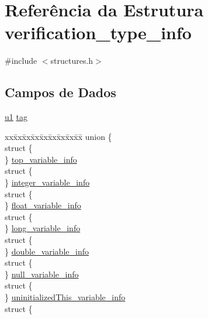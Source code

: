 \hypertarget{structverification__type__info}{}\section{Referência da Estrutura verification\+\_\+type\+\_\+info}
\label{structverification__type__info}


{\ttfamily \#include $<$structures.\+h$>$}

\subsection*{Campos de Dados}
\begin{DoxyCompactItemize}
\item 
\hyperlink{lista__operandos_8h_ad9f4cdb6757615aae2fad89dab3c5470}{u1} \hyperlink{structverification__type__info_aeb9c72b398b4d3ce0863a916f973b05c}{tag}
\item 
\begin{tabbing}
xx\=xx\=xx\=xx\=xx\=xx\=xx\=xx\=xx\=\kill
union \{\\
\>struct \{\\
\>\} \hyperlink{structverification__type__info_ae8a25f3b3f2824a904c772ecbbd249e1}{top\_variable\_info}\\
\>struct \{\\
\>\} \hyperlink{structverification__type__info_a518dcb2dd60e556d8ea4059f6a6dd3b1}{integer\_variable\_info}\\
\>struct \{\\
\>\} \hyperlink{structverification__type__info_a21e1445357184dfacb843c0e9d75c5a3}{float\_variable\_info}\\
\>struct \{\\
\>\} \hyperlink{structverification__type__info_ae205fc70c729fd4a92d31af0becd819d}{long\_variable\_info}\\
\>struct \{\\
\>\} \hyperlink{structverification__type__info_a0198e2c34f8ffc66cbfe8adf0ab20170}{double\_variable\_info}\\
\>struct \{\\
\>\} \hyperlink{structverification__type__info_a42ba92ebe27d42af296a395c54fa10ad}{null\_variable\_info}\\
\>struct \{\\
\>\} \hyperlink{structverification__type__info_a8b83ff57fc01ffdd4f7761af5ab72885}{uninitializedThis\_variable\_info}\\
\>struct \{\\

\end{tabbing}
\end{DoxyCompactItemize}
